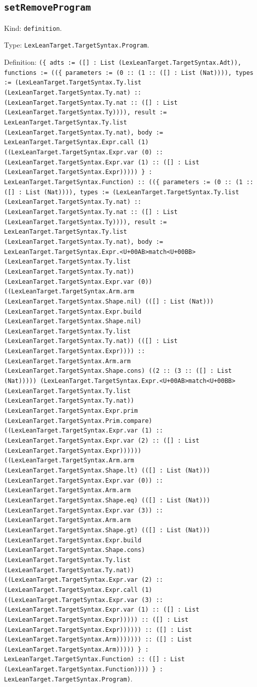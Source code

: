 \documentclass[11pt]{article}
\begin{document}
\subsection*{\texttt{setRemoveProgram}}
\noindent Kind: \texttt{definition}.\par
\noindent Type: \texttt{LexLeanTarget.TargetSyntax.Program}.\par
\noindent Definition: \texttt{(\{ adts := ([] : List (LexLeanTarget.TargetSyntax.Adt)), functions := ((\{ parameters := (0 :: (1 :: ([] : List (Nat)))), types := (LexLeanTarget.TargetSyntax.Ty.list (LexLeanTarget.TargetSyntax.Ty.nat) :: (LexLeanTarget.TargetSyntax.Ty.nat :: ([] : List (LexLeanTarget.TargetSyntax.Ty)))), result := LexLeanTarget.TargetSyntax.Ty.list (LexLeanTarget.TargetSyntax.Ty.nat), body := LexLeanTarget.TargetSyntax.Expr.call (1) ((LexLeanTarget.TargetSyntax.Expr.var (0) :: (LexLeanTarget.TargetSyntax.Expr.var (1) :: ([] : List (LexLeanTarget.TargetSyntax.Expr))))) \} : LexLeanTarget.TargetSyntax.Function) :: ((\{ parameters := (0 :: (1 :: ([] : List (Nat)))), types := (LexLeanTarget.TargetSyntax.Ty.list (LexLeanTarget.TargetSyntax.Ty.nat) :: (LexLeanTarget.TargetSyntax.Ty.nat :: ([] : List (LexLeanTarget.TargetSyntax.Ty)))), result := LexLeanTarget.TargetSyntax.Ty.list (LexLeanTarget.TargetSyntax.Ty.nat), body := LexLeanTarget.TargetSyntax.Expr.<U+00AB>match<U+00BB> (LexLeanTarget.TargetSyntax.Ty.list (LexLeanTarget.TargetSyntax.Ty.nat)) (LexLeanTarget.TargetSyntax.Expr.var (0)) ((LexLeanTarget.TargetSyntax.Arm.arm (LexLeanTarget.TargetSyntax.Shape.nil) (([] : List (Nat))) (LexLeanTarget.TargetSyntax.Expr.build (LexLeanTarget.TargetSyntax.Shape.nil) (LexLeanTarget.TargetSyntax.Ty.list (LexLeanTarget.TargetSyntax.Ty.nat)) (([] : List (LexLeanTarget.TargetSyntax.Expr)))) :: (LexLeanTarget.TargetSyntax.Arm.arm (LexLeanTarget.TargetSyntax.Shape.cons) ((2 :: (3 :: ([] : List (Nat))))) (LexLeanTarget.TargetSyntax.Expr.<U+00AB>match<U+00BB> (LexLeanTarget.TargetSyntax.Ty.list (LexLeanTarget.TargetSyntax.Ty.nat)) (LexLeanTarget.TargetSyntax.Expr.prim (LexLeanTarget.TargetSyntax.Prim.compare) ((LexLeanTarget.TargetSyntax.Expr.var (1) :: (LexLeanTarget.TargetSyntax.Expr.var (2) :: ([] : List (LexLeanTarget.TargetSyntax.Expr)))))) ((LexLeanTarget.TargetSyntax.Arm.arm (LexLeanTarget.TargetSyntax.Shape.lt) (([] : List (Nat))) (LexLeanTarget.TargetSyntax.Expr.var (0)) :: (LexLeanTarget.TargetSyntax.Arm.arm (LexLeanTarget.TargetSyntax.Shape.eq) (([] : List (Nat))) (LexLeanTarget.TargetSyntax.Expr.var (3)) :: (LexLeanTarget.TargetSyntax.Arm.arm (LexLeanTarget.TargetSyntax.Shape.gt) (([] : List (Nat))) (LexLeanTarget.TargetSyntax.Expr.build (LexLeanTarget.TargetSyntax.Shape.cons) (LexLeanTarget.TargetSyntax.Ty.list (LexLeanTarget.TargetSyntax.Ty.nat)) ((LexLeanTarget.TargetSyntax.Expr.var (2) :: (LexLeanTarget.TargetSyntax.Expr.call (1) ((LexLeanTarget.TargetSyntax.Expr.var (3) :: (LexLeanTarget.TargetSyntax.Expr.var (1) :: ([] : List (LexLeanTarget.TargetSyntax.Expr))))) :: ([] : List (LexLeanTarget.TargetSyntax.Expr)))))) :: ([] : List (LexLeanTarget.TargetSyntax.Arm))))))) :: ([] : List (LexLeanTarget.TargetSyntax.Arm))))) \} : LexLeanTarget.TargetSyntax.Function) :: ([] : List (LexLeanTarget.TargetSyntax.Function)))) \} : LexLeanTarget.TargetSyntax.Program)}.\par
\end{document}
